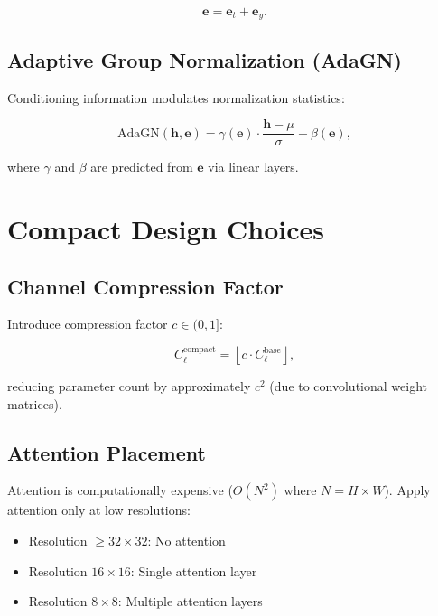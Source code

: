 \documentclass[12pt]{report}
\theoremstyle{definition}
\begin{document}
\begin{equation}
\mathbf{e} = \mathbf{e}_t + \mathbf{e}_y.
\label{eq:combined_embed}
\end{equation}

\subsection{Adaptive Group Normalization (AdaGN)}

Conditioning information modulates normalization statistics:

\begin{equation}
\text{AdaGN}(\mathbf{h}, \mathbf{e}) = \gamma(\mathbf{e}) \cdot \frac{\mathbf{h} - \mu}{\sigma} + \beta(\mathbf{e}),
\label{eq:adagn}
\end{equation}

where $\gamma$ and $\beta$ are predicted from $\mathbf{e}$ via linear layers.

\section{Compact Design Choices}

\subsection{Channel Compression Factor}

Introduce compression factor $c \in (0, 1]$:

\begin{equation}
C_\ell^{\text{compact}} = \left\lfloor c \cdot C_\ell^{\text{base}} \right\rfloor,
\label{eq:channel_compress}
\end{equation}

reducing parameter count by approximately $c^2$ (due to convolutional weight matrices).

\subsection{Attention Placement}

Attention is computationally expensive ($O(N^2)$ where $N = H \times W$). Apply attention only at low resolutions:

\begin{itemize}
\item Resolution $\geq 32 \times 32$: No attention
\item Resolution $16 \times 16$: Single attention layer
\item Resolution $8 \times 8$: Multiple attention layers
\end{itemize}
\end{document}

